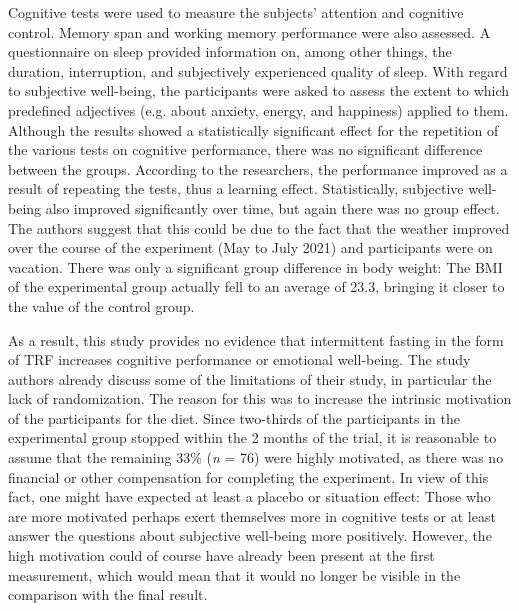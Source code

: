 \documentclass[authordate, reflection,issue]{jote-new-article}
\begin{document}
Cognitive tests were used to measure the subjects' attention and cognitive control. Memory span and working memory performance were also assessed. A questionnaire on sleep provided information on, among other things, the duration, interruption, and subjectively experienced quality of sleep. With regard to subjective well-being, the participants were asked to assess the extent to which predefined adjectives (e.g. about anxiety, energy, and happiness) applied to them. Although the results showed a statistically significant effect for the repetition of the various tests on cognitive performance, there was no significant difference between the groups. According to the researchers, the performance improved as a result of repeating the tests, thus a learning effect. Statistically, subjective well-being also improved significantly over time, but again there was no group effect. The authors suggest that this could be due to the fact that the weather improved over the course of the experiment (May to July 2021) and participants were on vacation. There was only a significant group difference in body weight: The BMI of the experimental group actually fell to an average of 23.3, bringing it closer to the value of the control group.







As a result, this study provides no evidence that intermittent fasting in the form of TRF increases cognitive performance or emotional well-being. The study authors already discuss some of the limitations of their study, in particular the lack of randomization. The reason for this was to increase the intrinsic motivation of the participants for the diet. Since two-thirds of the participants in the experimental group stopped within the 2 months of the trial, it is reasonable to assume that the remaining 33\% (\emph{n} = 76) were highly motivated, as there was no financial or other compensation for completing the experiment. In view of this fact, one might have expected at least a placebo or situation effect: Those who are more motivated perhaps exert themselves more in cognitive tests or at least answer the questions about subjective well-being more positively. However, the high motivation could of course have already been present at the first measurement, which would mean that it would no longer be visible in the comparison with the final result.
\end{document}
